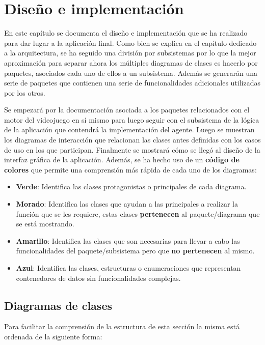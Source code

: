 \chapter{Diseño e implementación}
\label{cap:diseno}
En este capítulo se documenta el diseño e implementación que se ha realizado para dar lugar a la aplicación final. Como bien se explica en el capítulo dedicado a la arquitectura, se ha seguido una división por subsistemas por lo que la mejor aproximación para separar ahora los múltiples diagramas de clases es hacerlo por paquetes, asociados cada uno de ellos a un subsistema. Además se generarán una serie de paquetes que contienen una serie de funcionalidades adicionales utilizadas por los otros.

\bigskip

Se empezará por la documentación asociada a los paquetes relacionados con el motor del videojuego en sí mismo para luego seguir con el subsistema de la lógica de la aplicación que contendrá la implementación del agente. Luego se muestran los diagramas de interacción que relacionan las clases antes definidas con los casos de uso en los que participan. Finalmente se mostrará cómo se llegó al diseño de la interfaz gráfica de la aplicación. Además, se ha hecho uso de un \textbf{código de colores} que permite una comprensión más rápida de cada uno de los diagramas:

\begin{itemize}
	\item \textbf{Verde}: Identifica las clases protagonistas o principales de cada diagrama.
	\item \textbf{Morado}: Identifica las clases que ayudan a las principales a realizar la función que se les requiere, estas clases \textbf{pertenecen} al paquete/diagrama que se está mostrando.
	\item \textbf{Amarillo}: Identifica las clases que son necesarias para llevar a cabo las funcionalidades del paquete/subsistema pero que \textbf{no pertenecen} al mismo.
	\item \textbf{Azul}: Identifica las clases, estructuras o enumeraciones que representan contenedores de datos sin funcionalidades complejas.
\end{itemize}

\section{Diagramas de clases}

Para facilitar la comprensión de la estructura de esta sección la misma está ordenada de la siguiente forma:

